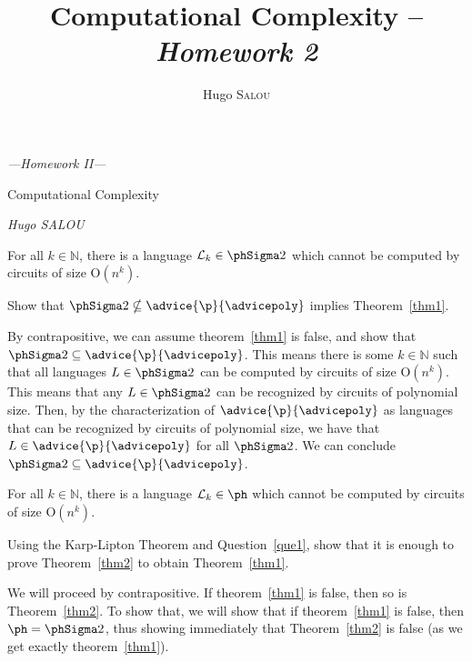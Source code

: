 \documentclass[fontsize=16pt,a4paper,DIV=17,parskip=half]{scrartcl}
\title{Computational Complexity -- \textit{Homework 2}}
\author{Hugo \textsc{Salou}}
\let\mathds\mathbb
\theoremstyle{definition}
\newcommand{\poly}{\advice{\p}{\advicepoly}}
\begin{document}
  \begin{center}
    \bfseries
    \sffamily

    {\large\itshape ---\hspace{1em}Homework II\hspace{1em}---}

    {\huge Computational Complexity}

    {\large \itshape Hugo SALOU}
  \end{center}

  \begin{thm}
     For all $k \in \mathds{N}$, there is a language $\mathcal{L}_k \in \phSigma 2$ which cannot be computed by circuits of size $\mathrm{O}(n^k)$.
     \label{thm1}
  \end{thm}

  \begin{que}
    Show that $\phSigma 2 \nsubseteq \poly$ implies Theorem~\ref{thm1}.
    \label{que1}
  \end{que}

  By contrapositive, we can assume theorem~\ref{thm1} is false, and show that $\phSigma 2 \subseteq \poly$.
  This means there is some $k \in \mathds{N}$ such that all languages $L \in \phSigma 2$ can be computed by circuits of size $\mathrm{O}(n^k)$.
  This means that any $L \in \phSigma 2$ can be recognized by circuits of polynomial size.
  Then, by the characterization of $\poly$ as languages that can be recognized by circuits of polynomial size, we have that $L \in \poly$ for all $\phSigma 2$.
  We can conclude  $\phSigma 2 \subseteq \poly$.
  
  \begin{thm}
     For all $k \in \mathds{N}$, there is a language $\mathcal{L}_k \in \ph$ which cannot be computed by circuits of size $\mathrm{O}(n^k)$.
     \label{thm2}
  \end{thm}

  \begin{que}
    Using the Karp-Lipton Theorem and Question~\ref{que1}, show that it is enough to prove Theorem~\ref{thm2} to obtain Theorem~\ref{thm1}.
    \label{que2}
  \end{que}

  We will proceed by contrapositive.
  If theorem~\ref{thm1} is false, then so is Theorem~\ref{thm2}.
  To show that, we will show that if theorem~\ref{thm1} is false, then $\ph = \phSigma 2$, thus showing immediately that Theorem~\ref{thm2} is false (as we get exactly theorem~\ref{thm1}).
\end{document}
